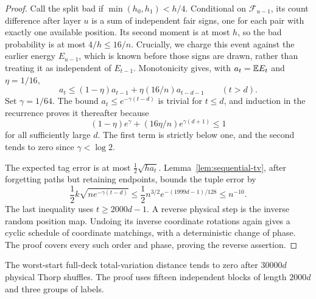 \begin{proof}
Call the split bad if $\min(h_0,h_1)<h/4$. Conditional on
$\mathcal F_{u-1}$, its count difference after layer $u$ is a
sum of independent fair signs, one for each pair with exactly one
available position. Its second moment is at most $h$, so the bad
probability is at most $4/h\le16/n$. Crucially, we charge this
event against the earlier energy $E_{u-1}$, which is known before
those signs are drawn, rather than treating it as independent of
$E_{t-1}$. Monotonicity gives, with $a_t=\mathbb E E_t$ and $\eta=1/16$,
\begin{equation}\label{lifts:delay-recurrence}
 a_t\le(1-\eta)a_{t-1}+\eta(16/n)a_{t-d-1}\qquad(t>d).
\end{equation}
Set $\gamma=1/64$. The bound $a_t\le e^{-\gamma(t-d)}$ is
trivial for $t\le d$, and induction in the recurrence proves it
thereafter because
\[
 (1-\eta)e^\gamma+(16\eta/n)e^{\gamma(d+1)}\le1
\]
for all sufficiently large $d$. The first term is strictly below
one, and the second tends to zero since $\gamma<\log2$.

The expected tag error is at most $\frac12\sqrt{ha_t}$.
Lemma~\ref{lem:sequential-tv}, after forgetting paths but retaining
endpoints, bounds the tuple error by
\[
 \frac12 k\sqrt{ne^{-\gamma(t-d)}}
 \le\frac12n^{3/2}e^{-(1999d-1)/128}\le n^{-10}.
\]
The last inequality uses $t\ge2000d-1$. A reverse physical step
is the inverse random position map. Undoing its inverse coordinate
rotations again gives a cyclic schedule of coordinate matchings,
with a deterministic change of phase. The proof covers every such
order and phase, proving the reverse assertion.
\end{proof}

\begin{theorem}
\label{lifts:three-group-theorem}
The worst-start full-deck total-variation distance tends to zero after
$30000d$ physical Thorp shuffles. The proof uses fifteen independent
blocks of length $2000d$ and three groups of labels.
\end{theorem}

